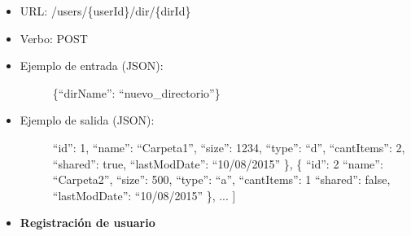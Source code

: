 \documentclass[letterpaper,10pt,english]{sphinxmanual}
\begin{document}
\begin{itemize}
\item {} 
URL: /users/\{userId\}/dir/\{dirId\}

\item {} 
Verbo: POST

\item {} \begin{description}
\item[{Ejemplo de entrada (JSON):}] \leavevmode
\{``dirName'': ``nuevo\_directorio''\}

\end{description}

\item {} \begin{description}
\item[{Ejemplo de salida (JSON):}] \leavevmode
``id'': 1,
``name'': ``Carpeta1'',
``size'': 1234,
``type'': ``d'',
``cantItems'': 2,
``shared'': true,
``lastModDate'': ``10/08/2015''
\},
\{
``id'': 2
``name'': ``Carpeta2'',
``size'': 500,
``type'': ``a'',
``cantItems'': 1
``shared'': false,
``lastModDate'': ``10/08/2015''
\},
...
{]}

\end{description}

\end{itemize}
\begin{itemize}
\item {} 
\textbf{Registración de usuario}

\end{itemize}
\end{document}
